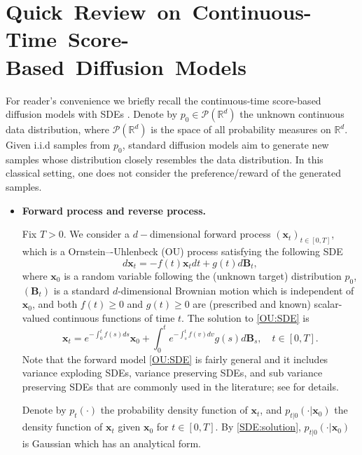 \documentclass[11pt]{article}
\begin{document}
\section{\mbox{Quick Review on Continuous-Time Score-Based Diffusion Models}}\label{sec:prelim}
For reader's convenience we briefly recall the continuous-time score-based diffusion models with SDEs \citep{SongICLR2021}. Denote by $p_{0} \in \mathcal{P} (\mathbb{R}^d) $ the unknown continuous data distribution, where $\mathcal{P}(\mathbb{R}^{d})$ is the space of all probability measures on $\mathbb{R}^{d}$. Given i.i.d samples from $p_{0}$, standard diffusion models aim to generate new samples whose distribution closely resembles the data distribution. In this classical setting, one does not consider the preference/reward of the generated samples.

\begin{itemize}

\item\textbf{Forward process and reverse process.}


Fix $T>0.$ We consider a $d-$dimensional forward process $(\mathbf{x}_{t})_{t \in [0, T]}$, which is a Ornstein–-Uhlenbeck (OU) process satisfying the following SDE
\begin{equation}\label{OU:SDE}
d\mathbf{x}_{t}=-f(t)\mathbf{x}_{t}dt+g(t)d\mathbf{B}_{t},
\end{equation}
where $\mathbf{x}_{0}$ is a random variable following the (unknown target) distribution $p_{0}$, $(\mathbf{B}_{t})$ is a standard $d$-dimensional Brownian motion which is independent of $\mathbf{x}_{0}$, and both $f(t)\geq0$ and $g(t)\geq0$ are (prescribed and known) scalar-valued continuous functions of time $t$.  The solution to \eqref{OU:SDE} is
\begin{equation}\label{SDE:solution}
\mathbf{x}_{t}=e^{-\int_{0}^{t}f(s)ds}\mathbf{x}_{0}+\int_{0}^{t}e^{-\int_{s}^{t}f(v)dv}g(s)d\mathbf{B}_{s}, \quad t \in[0, T].
\end{equation}
Note that the  forward model \eqref{OU:SDE} is fairly general and it includes variance exploding SDEs, variance preserving SDEs, and sub variance preserving SDEs that are commonly used in the literature; see \cite{SongICLR2021} for details.

Denote by $p_t(\cdot)$ the probability density function of $\mathbf{x}_{t}$, and $p_{t|0}(\cdot | \mathbf{x}_{0})$ the density function of $\mathbf{x}_{t}$ given $\mathbf{x}_{0}$ for $t \in[0, T].$
By \eqref{SDE:solution}, $p_{t|0}(\cdot | \mathbf{x}_{0})$ is Gaussian which has an analytical form. %



\end{itemize}
\end{document}
